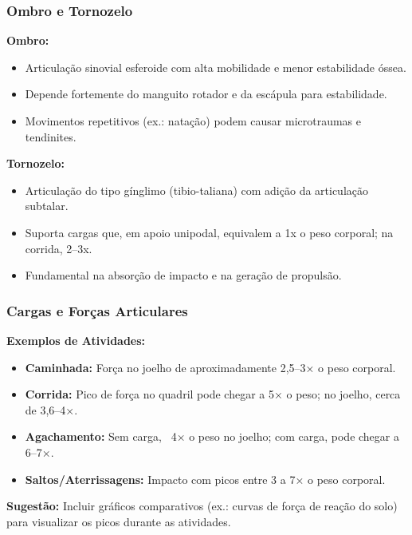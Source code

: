 \documentclass{beamer}
\begin{document}
\begin{frame}
\frametitle{Ombro e Tornozelo}
\textbf{Ombro:}
\begin{itemize}
    \item Articulação sinovial esferoide com alta mobilidade e menor estabilidade óssea.
    \item Depende fortemente do manguito rotador e da escápula para estabilidade.
    \item Movimentos repetitivos (ex.: natação) podem causar microtraumas e tendinites.
\end{itemize}
\vspace{0.3cm}
\textbf{Tornozelo:}
\begin{itemize}
    \item Articulação do tipo gínglimo (tibio-taliana) com adição da articulação subtalar.
    \item Suporta cargas que, em apoio unipodal, equivalem a 1x o peso corporal; na corrida, 2–3x.
    \item Fundamental na absorção de impacto e na geração de propulsão.
\end{itemize}
\end{frame}

\begin{frame}
\frametitle{Cargas e Forças Articulares}
\textbf{Exemplos de Atividades:}
\begin{itemize}
    \item \textbf{Caminhada:} Força no joelho de aproximadamente 2,5–3× o peso corporal.
    \item \textbf{Corrida:} Pico de força no quadril pode chegar a 5× o peso; no joelho, cerca de 3,6–4×.
    \item \textbf{Agachamento:} Sem carga, ~4× o peso no joelho; com carga, pode chegar a 6–7×.
    \item \textbf{Saltos/Aterrissagens:} Impacto com picos entre 3 a 7× o peso corporal.
\end{itemize}

\bigskip
\textbf{Sugestão:} Incluir gráficos comparativos (ex.: curvas de força de reação do solo) para visualizar os picos durante as atividades.
\end{frame}
\end{document}
